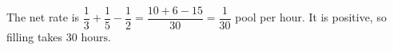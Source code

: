 The net rate is $\dfrac{1}{3}+\dfrac{1}{5}-\dfrac{1}{2}=\dfrac{10+6-15}{30}=\dfrac{1}{30}$ pool per hour. It is positive, so filling takes $\boxed{30\text{ hours}}$.
